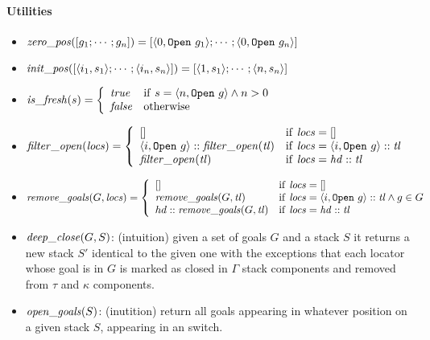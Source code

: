 \paragraph{Utilities}
\begin{itemize}
 \item $\mathit{zero\_pos}([g_1;\cdots;g_n]) =
  [\langle 0,\mathtt{Open}~g_1\rangle;\cdots;\langle 0,\mathtt{Open}~g_n\rangle]$
 \item $\mathit{init\_pos}([\langle i_1,s_1\rangle;\cdots;\langle i_n,s_n\rangle]) =
  [\langle 1,s_1\rangle;\cdots;\langle n,s_n\rangle]$
 \item $\mathit{is\_fresh}(s) =
  \left\{
  \begin{array}{ll}
   \mathit{true} & \mathrm{if} ~ s = \langle n, \mathtt{Open}~g\rangle\land n > 0 \\
   \mathit{false} & \mathrm{otherwise} \\
  \end{array}
  \right.$
 \item $\mathit{filter\_open}(\mathit{locs})=
  \left\{
  \begin{array}{ll}
   [] & \mathrm{if}~\mathit{locs} = [] \\
   \langle i,\mathtt{Open}~g\rangle :: \mathit{filter\_open}(\mathit{tl})
   & \mathrm{if}~\mathit{locs} = \langle i,\mathtt{Open}~g\rangle :: \mathit{tl} \\
   \mathit{filter\_open}(\mathit{tl})
   & \mathrm{if}~\mathit{locs} = \mathit{hd} :: \mathit{tl} \\
  \end{array}
  \right.$
 \item $\mathit{remove\_goals}(G,\mathit{locs}) =
  \left\{
  \begin{array}{ll}
   [] & \mathrm{if}~\mathit{locs} = [] \\
   \mathit{remove\_goals}(G,\mathit{tl})
   & \mathrm{if}~\mathit{locs} = \langle i,\mathtt{Open}~g\rangle :: \mathit{tl}
     \land g\in G\\
   hd :: \mathit{remove\_goals}(G,\mathit{tl})
   & \mathrm{if}~\mathit{locs} = \mathit{hd} :: \mathit{tl} \\
  \end{array}
  \right.$
 \item $\mathit{deep\_close}(G,S)$: (intuition) given a set of goals $G$ and a stack $S$
  it returns a new stack $S'$ identical to the given one with the exceptions
  that each locator whose goal is in $G$ is marked as closed in $\Gamma$ stack
  components and removed from $\tau$ and $\kappa$ components.
 \item $\mathit{open\_goals}(S)$: (inutition) return all goals appearing in whatever position
  on a given stack $S$, appearing in an \OPEN{} switch.
\end{itemize}

